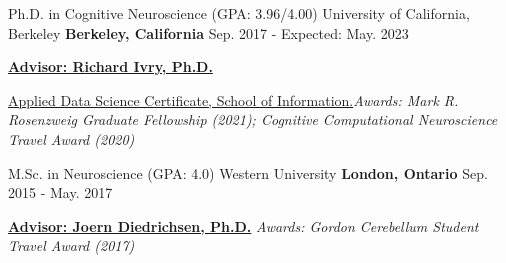 

\begin{cventries}

  \cventry
    {Ph.D. in Cognitive Neuroscience (GPA: 3.96/4.00)} %
    {University of California, Berkeley} %
    {\textbf{Berkeley, California}} %
    {Sep. 2017 - Expected: May. 2023} %
    {
      \begin{cvitems} %
        \item {{\href{http://ivrylab.berkeley.edu/rich-ivry.html}{\textbf{Advisor: Richard Ivry, Ph.D.}}}}
        \item {{\href{https://www.ischool.berkeley.edu/programs/data-science-certificate}{Applied Data Science Certificate, School of Information.}}\textit{Awards: Mark R. Rosenzweig Graduate Fellowship (2021); Cognitive Computational Neuroscience Travel Award (2020)}}
      \end{cvitems}
    }

  \cventry
    {M.Sc. in Neuroscience (GPA: 4.0)} %
    {Western University} %
    {\textbf{London, Ontario}} %
    {Sep. 2015 - May. 2017} %
    {
      \begin{cvitems} %
        \item {{\href{http://www.diedrichsenlab.org/}{\textbf{Advisor: Joern Diedrichsen, Ph.D.}}} \textit{Awards: Gordon Cerebellum Student Travel Award (2017)}}
      \end{cvitems}
    }
    

\end{cventries}
